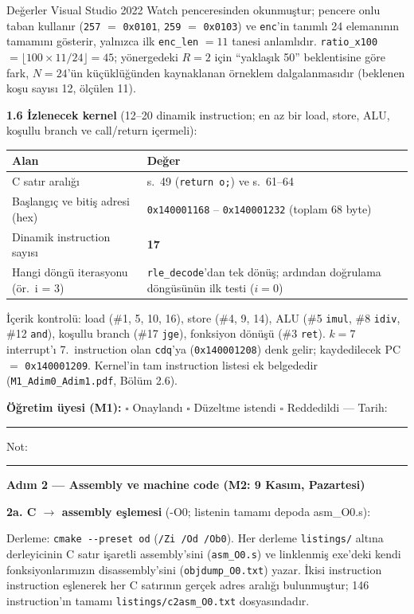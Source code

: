 \documentclass[11pt,a4paper]{article}
\newcommand{\tl}{\texttt}
\newcommand{\hd}[1]{\cellcolor{hdr}#1}
\begin{document}
Değerler Visual Studio 2022 Watch penceresinden okunmuştur; pencere onlu taban kullanır
(\tl{257} $=$ \tl{0x0101}, \tl{259} $=$ \tl{0x0103}) ve \tl{enc}'in tanımlı 24 elemanının
tamamını gösterir, yalnızca ilk \tl{enc\_len} $= 11$ tanesi anlamlıdır.
\tl{ratio\_x100} $= \lfloor 100 \times 11 / 24 \rfloor = 45$; yönergedeki $R = 2$ için
``yaklaşık 50'' beklentisine göre fark, $N = 24$'ün küçüklüğünden kaynaklanan örneklem
dalgalanmasıdır (beklenen koşu sayısı 12, ölçülen 11).

\textbf{1.6 İzlenecek kernel} (12--20 dinamik instruction; en az bir load, store, ALU, koşullu
branch ve call/return içermeli):

\begin{longtable}{|p{6.0cm}|p{9.5cm}|}
\hline
\hd{Alan} & \hd{Değer}\\
\hline
C satır aralığı & s.~49 (\tl{return o;}) ve s.~61--64\\
\hline
Başlangıç ve bitiş adresi (hex) & \tl{0x140001168} -- \tl{0x140001232} (toplam 68 byte)\\
\hline
Dinamik instruction sayısı & \textbf{17}\\
\hline
Hangi döngü iterasyonu (ör.\ i = 3) & \tl{rle\_decode}'dan tek dönüş; ardından doğrulama döngüsünün ilk testi ($i = 0$)\\
\hline
\end{longtable}

İçerik kontrolü: load (\#1, 5, 10, 16), store (\#4, 9, 14), ALU (\#5 \tl{imul}, \#8 \tl{idiv},
\#12 \tl{and}), koşullu branch (\#17 \tl{jge}), fonksiyon dönüşü (\#3 \tl{ret}).
$k = 7$ interrupt'ı 7.~instruction olan \tl{cdq}'ya (\tl{0x140001208}) denk gelir; kaydedilecek
PC $=$ \tl{0x140001209}. Kernel'in tam instruction listesi ek belgededir
(\tl{M1\_Adim0\_Adim1.pdf}, Bölüm 2.6).

\textbf{Öğretim üyesi (M1):} $\square$ Onaylandı \quad $\square$ Düzeltme istendi \quad
$\square$ Reddedildi --- Tarih: \rule{2.2cm}{0.4pt} \quad Not: \rule{2.2cm}{0.4pt}

\textbf{Adım 2 --- Assembly ve machine code (M2: 9 Kasım, Pazartesi)}

\textbf{2a. C $\rightarrow$ assembly eşlemesi} (-O0; listenin tamamı depoda asm\_O0.s):

Derleme: \tl{cmake -{}-preset od} (\tl{/Zi /Od /Ob0}). Her derleme \tl{listings/} altına
derleyicinin C satır işaretli assembly'sini (\tl{asm\_O0.s}) ve linklenmiş exe'deki kendi
fonksiyonlarımızın disassembly'sini (\tl{objdump\_O0.txt}) yazar. İkisi instruction instruction
eşlenerek her C satırının gerçek adres aralığı bulunmuştur; 146 instruction'ın tamamı
\tl{listings/c2asm\_O0.txt} dosyasındadır.
\end{document}
